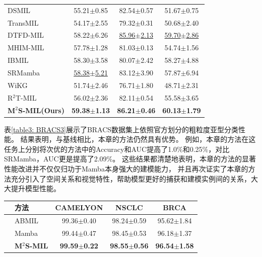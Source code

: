 {\begin{xltabular}{\textwidth}{XCCC}
  DSMIL~\cite{li2021dual}          & 55.21$\pm$0.85 & 82.54$\pm$0.57 & 51.67$\pm$0.75\\
  TransMIL~\cite{shao2021transmil} & 54.17$\pm$2.55 & 79.32$\pm$0.31 & 50.68$\pm$2.40  \\
  DTFD-MIL~\cite{zhang2022dtfd}    & 58.22$\pm$6.26 &\underline{85.96$\pm$2.13} &\underline{59.70$\pm$2.86} \\
  MHIM-MIL~\cite{tang2023multiple}    &57.78$\pm$1.28 & 81.03$\pm$0.13 &54.74$\pm$1.56 \\
  IBMIL~\cite{lin2023interventional}    & 58.30$\pm$3.58 & 80.07$\pm$2.42 & 58.27$\pm$4.88\\
  SRMamba ~\cite{yang2024mambamil}& \underline{58.38$\pm$5.21}&83.12$\pm$3.90 & 57.87$\pm$6.94 \\
  WiKG ~\cite{li2024dynamic}& 51.74$\pm$2.46 & 76.71$\pm$1.80 & 48.71$\pm$2.31 \\
  R$^2$T-MIL ~\cite{tang2024feature}& 56.02$\pm$2.36 &82.11$\pm$0.54 & 55.58$\pm$3.65  \\
  \textbf{M$^2$S-MIL(Ours)} &\textbf{59.38$\pm$1.13} &\textbf{86.21$\pm$0.46} & \textbf{60.13$\pm$1.79}\\

\end{xltabular}}




表\ref{table3: BRACS3}展示了BRACS数据集上依照官方划分的粗粒度亚型分类性能。
结果表明，与基线相比，本章的方法仍然具有优势。
例如，本章的方法在这任务上分别将次优的方法中的Accuracy和AUC提高了1.0\%和0.25\%，对比SRMamba，AUC更是提高了2.09\%。
这些结果都清楚地表明，本章的方法的显著性能改进并不仅仅归功于Mamba本身强大的建模能力，
并且再次证实了本章的方法充分引入了空间关系和视觉特性，帮助模型更好的捕获和建模实例间的关系，大大提升模型性能。

\begin{table}[h!]
  \large    %
  \centering
  \begin{tabularx}{\textwidth}{clCCC}
    \toprule
    &方法  & CAMELYON& NSCLC&BRCA\\ \midrule
    &
    ABMIL~\cite{ilse2018attention} &  99.36$\pm$0.40 & 98.24$\pm$0.59 & 95.62$\pm$1.84   \\
    &Mamba ~\cite{gu2023mamba} & 99.44$\pm$0.47 & 98.45$\pm$0.53 & 96.18$\pm$1.37  \\
    &\textbf{M$^2$S-MIL}  &  \textbf{99.59$\pm$0.22} & \textbf{98.55$\pm$0.56} & \textbf{96.54$\pm$1.58}  \\    \bottomrule
  \end{tabularx}
  \label{table3: UNI}
\end{table}

